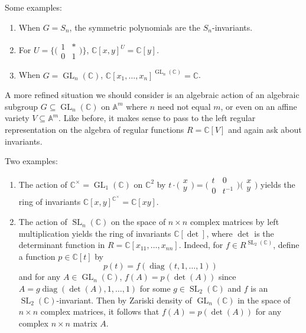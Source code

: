 \documentclass[11pt,leqno]{article}
\theoremstyle{plain}
\theoremstyle{definition}
\numberwithin{equation}{section}
\numberwithin{lem}{section}
\DeclareMathOperator{\GL}{GL}
\DeclareMathOperator{\SL}{SL}
\DeclareMathOperator{\diag}{diag}
\begin{document}
Some examples: \begin{enumerate}
  \item When $G = S_n$, the symmetric polynomials are the $S_n$-invariants.
  \item For $U = \{\big(\!\begin{smallmatrix}
        1 & \ast \\ 0 & 1
  \end{smallmatrix}\!\big)\}$, $\mathbb C[x,y]^U = \mathbb C[y]$.
  \item When $G = \GL_n(\mathbb C)$, $\mathbb C[x_1,\dots,x_n]^{\GL_n(\mathbb C)} = \mathbb C$.
\end{enumerate}

A more refined situation we should consider is an algebraic action of an algebraic subgroup $G\subseteq \GL_n(\mathbb C)$ on $\mathbb A^m$ where $n$ need not equal $m$, or even on an affine variety $V\subseteq \mathbb A^m$. Like before, it makes sense to pass to the left regular representation on the algebra of regular functions $R = \mathbb C[V]$ and again ask about invariants.

Two examples: \begin{enumerate}
  \item The action of $\mathbb C^\times = \GL_1(\mathbb C)$ on $\mathbb C^2$ by $t\cdot \big(\!\begin{smallmatrix}
        x \\ y 
  \end{smallmatrix}\!\big) = \big(\!\begin{smallmatrix}
        t & 0 \\ 0 & t^{-1}
  \end{smallmatrix}\!\big)\big(\!\begin{smallmatrix}
        x \\ y 
  \end{smallmatrix}\!\big)$ yields the ring of invariants $\mathbb C[x,y]^{\mathbb C^\times} = \mathbb C[xy]$.
  \item The action of $\SL_n(\mathbb C)$ on the space of $n\times n$ complex matrices by left multiplication yields the ring of invariants $\mathbb C[\det]$, where $\det$ is the determinant function in $R = \mathbb C[x_{11},\dots,x_{nn}]$. Indeed, for $f\in R^{\SL_2(\mathbb C)}$, define a function $p\in \mathbb C[t]$ by
  \[p(t) = f(\diag(t,1,\dots,1))\]
  and for any $A\in \GL_n(\mathbb C)$, $f(A) = p(\det(A))$ since $A = g\diag(\det(A),1,\dots,1)$ for some $g\in \SL_2(\mathbb C)$ and $f$ is an $\SL_2(\mathbb C)$-invariant. Then by Zariski density of $\GL_n(\mathbb C)$ in the space of $n\times n$ complex matrices, it follows that $f(A) = p(\det(A))$ for any complex $n\times n$ matrix $A$.
\end{enumerate}
\end{document}
